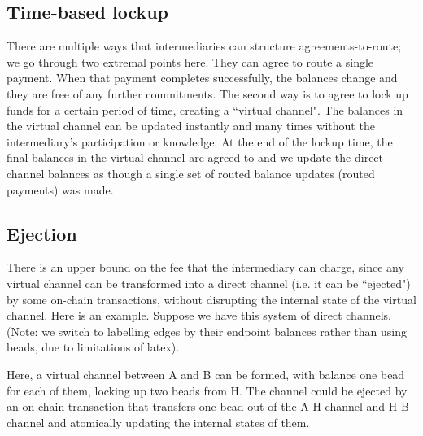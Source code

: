 \documentclass{article}
\begin{document}

\subsection*{Time-based lockup}

There are multiple ways that intermediaries can structure agreements-to-route; we go through two extremal points here. They can agree to route a single payment. When that payment completes successfully, the balances change and they are free of any further commitments. The second way is to agree to lock up funds for a certain period of time, creating a ``virtual channel". The balances in the virtual channel can be updated instantly and many times without the intermediary's participation or knowledge. At the end of the lockup time, the final balances in the virtual channel are agreed to and we update the direct channel balances as though a single set of routed balance updates (routed payments) was made.

\subsection*{Ejection}

There is an upper bound on the fee that the intermediary can charge, since any virtual channel can be transformed into a direct channel (i.e. it can be ``ejected") by some on-chain transactions, without disrupting the internal state of the virtual channel. Here is an example. Suppose we have this system of direct channels. (Note: we switch to labelling edges by their endpoint balances rather than using beads, due to limitations of latex).

\begin{figure}[H]
    \centering
\end{figure}

Here, a virtual channel between A and B can be formed, with balance one bead for each of them, locking up two beads from H. The channel could be ejected by an on-chain transaction that transfers one bead out of the A-H channel and H-B channel and atomically updating the internal states of them.
\end{document}
